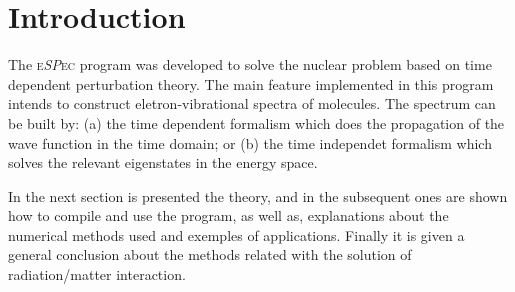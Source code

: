 \chapter{Introduction}
The \textsc{e\textit{SP}ec} program was developed to solve the nuclear problem based on time dependent perturbation theory. The main feature implemented in this program intends to construct eletron-vibrational spectra of molecules. The spectrum can be built by: (a) the time dependent formalism which does the propagation of the wave function in the time domain; or (b) the time independet formalism which solves the relevant eigenstates in the energy space. 

In the next section is presented the theory, and in the subsequent ones are shown how to compile and use the program, as well as, explanations about the numerical methods used and exemples of applications. Finally it is given a general conclusion about the methods related with the solution of radiation/matter interaction.   
